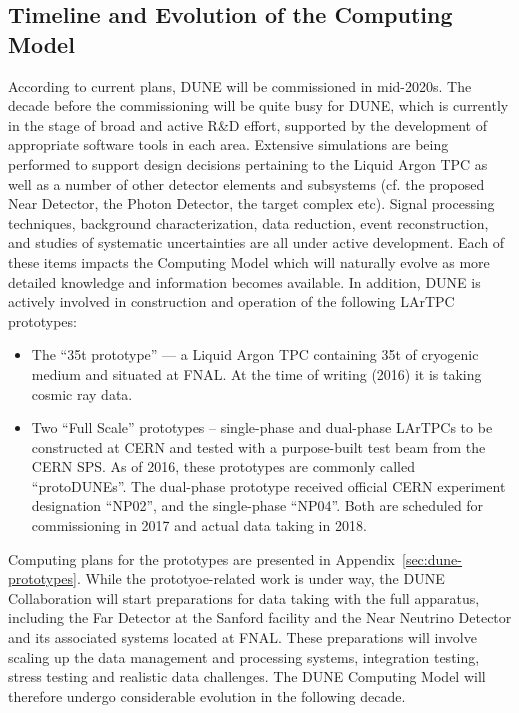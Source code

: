 \subsection{Timeline and Evolution of the Computing Model}
\label{sec:timeline}
According to current plans, DUNE will be commissioned in mid-2020s. The decade before the commissioning will be quite busy
for DUNE, which is currently in the stage of broad and active R\&D effort, supported by the development of appropriate 
software tools in each area. Extensive simulations are being performed to support design decisions pertaining to the Liquid 
Argon TPC as well as a number of other detector elements and subsystems (cf. the proposed Near Detector, the Photon Detector, 
the target complex etc). Signal processing techniques, background characterization, data reduction, event reconstruction,
and studies of systematic  uncertainties are all under active development. Each of these items impacts the Computing Model
which will naturally evolve as more detailed knowledge and information becomes available. In addition, DUNE is actively 
involved in construction and operation of the following LArTPC prototypes:
\begin{itemize}

\item The ``35t prototype'' --- a Liquid Argon TPC containing 35t of cryogenic medium and situated at FNAL.
At the time of writing (2016) it is taking cosmic ray data.

\item Two ``Full Scale'' prototypes -- single-phase and dual-phase LArTPCs to be constructed at CERN and tested with a purpose-built
test beam from the CERN SPS. As of 2016, these prototypes are
commonly called ``protoDUNEs''. The dual-phase prototype received official CERN experiment designation ``NP02'', and the single-phase ``NP04''.
Both are scheduled for commissioning in 2017 and actual data taking in 2018.

\end{itemize}

\noindent
Computing plans for the prototypes are presented in Appendix~\ref{sec:dune-prototypes}.
While the prototyoe-related work is under way, the DUNE Collaboration will start preparations for data taking with the
full apparatus, including the Far Detector at the Sanford facility and the Near Neutrino Detector and its associated systems
located at FNAL.  These preparations will involve scaling up the data management and processing systems,
integration testing,  stress testing and realistic data challenges.
The DUNE Computing Model will therefore undergo considerable evolution in the following decade.

